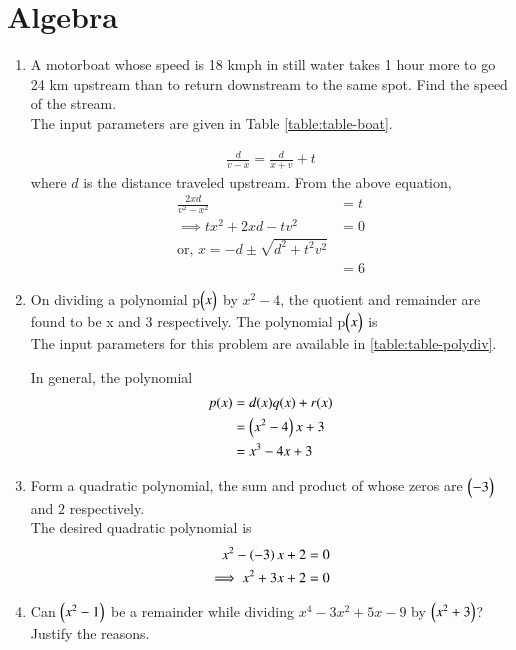 \documentclass[journal,12pt,twocolumn]{IEEEtran}
\begin{document}
\section{Algebra}
\begin{enumerate}
        \item A motorboat whose speed is 18 kmph in still water takes 1 hour more to go 24 km upstream than to return downstream to the same spot. Find the speed of the stream.\\
		\solution The input parameters are given in Table 
\eqref{table:table-boat}.	
\begin{table}[ht!]
	
\caption{}
\label{table:table-boat}	
\end{table}
		    \begin{align}
			    \frac{d}{v-x} = \frac{d}{x+v} + t 
		    \end{align}
		    where $d$ is the distance traveled upstream.  From the above equation, 
		    \begin{align}
			    \frac{2xd}{v^2 - x^2} &= t
			    \\
			    \implies 
			    tx^2 +2xd -tv^2 &=0
			    \\
			    \text{or, } x= -d \pm \sqrt{d^2 + t^2v^2}& 
			    \\
			    &= 6
		    \end{align}
 \item On dividing a polynomial p$\begin{pmatrix}x\end{pmatrix}$ by $x^2 - 4$, the quotient and remainder are found to be x and 3 respectively. The polynomial p$\begin{pmatrix}x\end{pmatrix}$ is 
	 \\
\solution The input parameters for this problem are available in 
\eqref{table:table-polydiv}.	
\begin{table}[ht!]
	
\caption{}
\label{table:table-polydiv}	
\end{table}

		In general, the polynomial
\begin{align}
	p(x) &= d(x)q(x) + r(x)
	\\
	&= \left(x^2-4\right)x +3
	\\
	&= x^3 - 4x + 3
\end{align}
    \item Form a quadratic polynomial, the sum and product of whose zeros are $\begin{pmatrix}-3\end{pmatrix}$ and $2$ respectively.\\
	    \solution  The desired quadratic polynomial is 
  \begin{align}
	  x^2 -\left(-3\right)x + 2 &= 0 
	  \\
	  \implies x^2 +3x + 2 &= 0 
  \end{align}
    \item Can $\begin{pmatrix}x^2 - 1\end{pmatrix}$ be a remainder while dividing $x^4 - 3x^2 + 5x - 9$ by $\begin{pmatrix}x^2 + 3\end{pmatrix}$? Justify the reasons.\\
	    \solution  


\end{enumerate}
\end{document}
